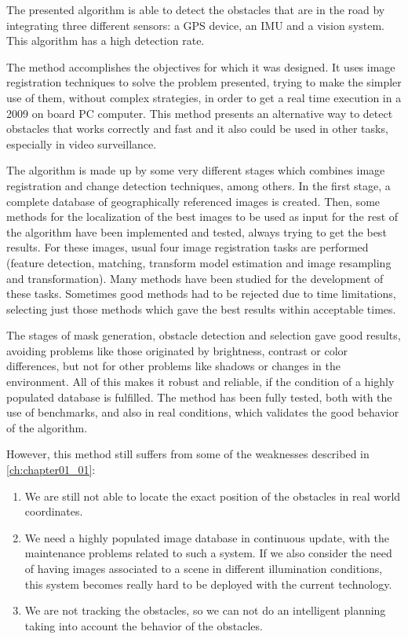 The presented algorithm is able to detect the obstacles that are in the road by integrating three different sensors: a \ac{GPS} device, an \ac{IMU} and a vision system. This algorithm has a high detection rate.

The method accomplishes the objectives for which it was designed. It uses image registration techniques to solve the problem presented, trying to make the simpler use of them, without complex strategies, in order to get a real time execution in a 2009 on board PC computer. This method presents an alternative way to detect obstacles that works correctly and fast and it also could be used in other tasks, especially in video surveillance.

The algorithm is made up by some very different stages which combines image registration and change detection techniques, among others. In the first stage, a complete database of geographically referenced images is created. Then, some methods for the localization of the best images to be used as input for the rest of the algorithm have been implemented and tested, always trying to get the best results. For these images, usual four image registration tasks are performed (feature detection, matching, transform model estimation and image resampling and transformation). Many methods have been studied for the development of these tasks. Sometimes good methods had to be rejected due to time limitations, selecting just those methods which gave the best results within acceptable times.

The stages of mask generation, obstacle detection and selection gave good results, avoiding problems like those originated by brightness, contrast or color differences, but not for other problems like shadows or changes in the environment. All of this makes it robust and reliable, if the condition of a highly populated database is fulfilled. The method has been fully tested, both with the use of benchmarks, and also in real conditions, which validates the good behavior of the algorithm.

However, this method still suffers from some of the weaknesses described in \ref{ch:chapter01_01}:
\begin{enumerate}
 \item We are still not able to locate the exact position of the obstacles in real world coordinates.
 \item We need a highly populated image database in continuous update, with the maintenance problems related to such a system. If we also consider the need of having images associated to a scene in different illumination conditions, this system becomes really hard to be deployed with the current technology.
 \item We are not tracking the obstacles, so we can not do an intelligent planning taking into account the behavior of the obstacles. 
\end{enumerate}


